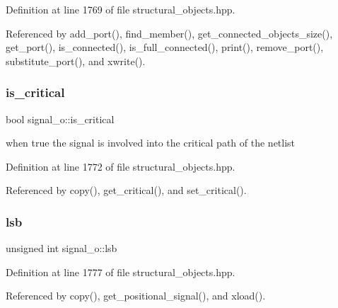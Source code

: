 Definition at line 1769 of file structural\+\_\+objects.\+hpp.



Referenced by add\+\_\+port(), find\+\_\+member(), get\+\_\+connected\+\_\+objects\+\_\+size(), get\+\_\+port(), is\+\_\+connected(), is\+\_\+full\+\_\+connected(), print(), remove\+\_\+port(), substitute\+\_\+port(), and xwrite().

\mbox{\label{classsignal__o_a74be21f14c8bb79c0f2427fa2234afee}} 
\subsubsection{\texorpdfstring{is\+\_\+critical}{is\_critical}}
{\footnotesize\ttfamily bool signal\+\_\+o\+::is\+\_\+critical\hspace{0.3cm}{\ttfamily [private]}}



when true the signal is involved into the critical path of the netlist 



Definition at line 1772 of file structural\+\_\+objects.\+hpp.



Referenced by copy(), get\+\_\+critical(), and set\+\_\+critical().

\mbox{\label{classsignal__o_a8dece1049d2b9baffd905f80d0baa578}} 
\subsubsection{\texorpdfstring{lsb}{lsb}}
{\footnotesize\ttfamily unsigned int signal\+\_\+o\+::lsb\hspace{0.3cm}{\ttfamily [private]}}



Definition at line 1777 of file structural\+\_\+objects.\+hpp.



Referenced by copy(), get\+\_\+positional\+\_\+signal(), and xload().

\mbox{\label{classsignal__o_a95d8799c5c71954adba4f8bdfb1e4f10}} 
